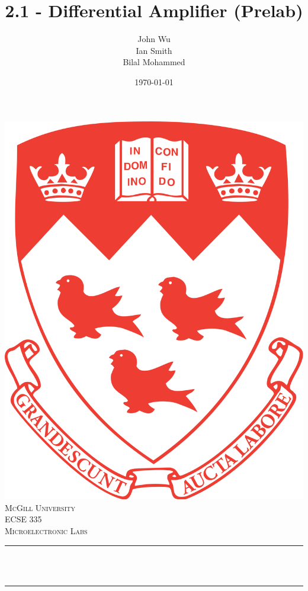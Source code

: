 \documentclass[12pt]{article}
\title{2.1 - Differential Amplifier (Prelab)}                             %
\author{John Wu \\ Ian Smith \\ Bilal Mohammed}                               %
\date{\today}                                           %
\makeatletter
\let\thetitle\@title
\makeatother
\begin{document}

\begin{titlepage}
    \centering
    \vspace*{0.5 cm}
    \includegraphics[scale = 0.07]{mcgill-logo.png}\\[1.0 cm]   %
    \textsc{\LARGE McGill University}\\[1.0 cm]   %
    \textsc{\Large ECSE 335}\\[0.5 cm]               %
    \textsc{\large Microelectronic Labs}\\[0.5 cm]               %
    \rule{\linewidth}{0.2 mm} \\[0.4 cm]
    { \huge \bfseries \thetitle}\\
    \rule{\linewidth}{0.2 mm} \\[1.5 cm]
    \begin{minipage}{0.4\textwidth}
        \begin{flushleft} \large

\end{flushleft}
\end{minipage}
\end{titlepage}
\end{document}
